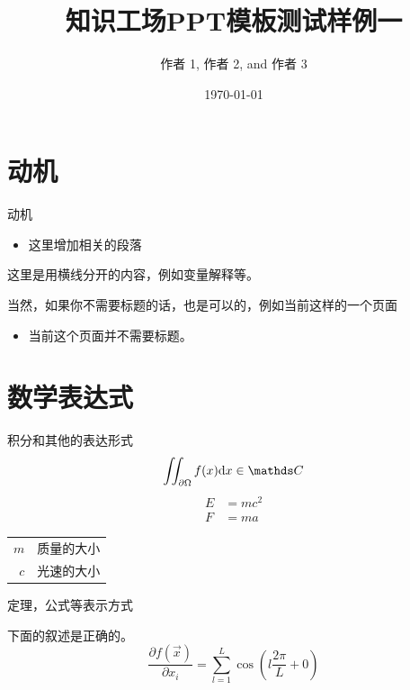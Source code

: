 \documentclass{kw-cn}
\title{知识工场PPT模板测试样例一}
\author{作者 1\inst{1}, 作者 2\inst{1}, and 作者 3\inst{2}}
\institute[]{%
	\inst{1} 复旦大学知识工场实验室\\
	\inst{2} 复旦大学计算机科学与技术学院
}
\date{\today}
\begin{document}
\begin{frame}[plain]
	\titlepage
\end{frame}

\section{动机}
\begin{frame}{动机}
	\begin{itemize}
		\item 这里增加相关的段落
	\end{itemize}
	
	\seprule
	
	这里是用横线分开的内容，例如变量解释等。
\end{frame}
\begin{frame}
	当然，如果你不需要标题的话，也是可以的，例如当前这样的一个页面
	\begin{itemize}
		\item 当前这个页面并不需要标题。
	\end{itemize}
\end{frame}

\section{数学表达式}
\begin{frame}{积分和其他的表达形式}
	\begin{equation}
		\iint_{\partial\Omega}f(x)\diff{x} \in \complexes
	\end{equation}
	\begin{align}
		E &= mc^2\\
		F &= ma
	\end{align}

	\seprule
	
	\begin{tabular}{rl}
		$m$ & 质量的大小\\
		$c$ & 光速的大小
	\end{tabular}
\end{frame}
\begin{frame}{定理，公式等表示方式}
	\begin{theorem}
		下面的叙述是正确的。
		\begin{equation}
			\frac{\partial f(\vec{x})}{\partial x_i} = \sum_{l=1}^{L}\cos\left(l\frac{2\pi}{L} + 0\right)
		\end{equation}
	\end{theorem}
\end{frame}
\end{document}
